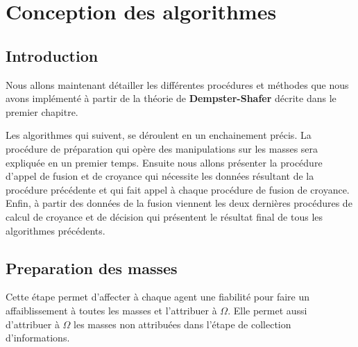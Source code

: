 \chapter{Conception des algorithmes}

{}
\section*{Introduction}

Nous allons maintenant détailler les différentes procédures et méthodes que nous avons implémenté à partir de la théorie de\textbf{ Dempster-Shafer} décrite dans le premier chapitre.

Les algorithmes qui suivent, se déroulent en un enchainement précis.
La procédure de préparation qui opère des manipulations sur les masses sera expliquée en un premier temps. Ensuite nous allons présenter la procédure d'appel de fusion et de croyance qui nécessite les données résultant de la procédure précédente et qui fait appel à chaque procédure de fusion de croyance. Enfin, à partir des données de la fusion viennent les deux dernières procédures de calcul de croyance et de décision qui présentent le résultat final de tous les algorithmes précédents.

\DontPrintSemicolon
\section{Preparation des masses}
Cette étape permet d'affecter à chaque agent une fiabilité pour faire un affaiblissement à toutes les masses et l'attribuer à $\Omega$. Elle permet aussi d'attribuer à $\Omega$ les masses non attribuées dans l'étape de collection d'informations.   

